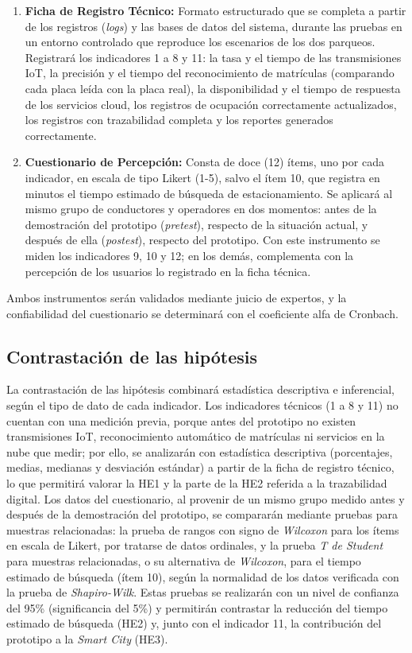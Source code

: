 \documentclass[12pt,a4paper]{article}
\begin{document}
\begin{enumerate}
	\item \textbf{Ficha de Registro Técnico:} Formato estructurado que se completa a partir de los registros (\textit{logs}) y las bases de datos del sistema, durante las pruebas en un entorno controlado que reproduce los escenarios de los dos parqueos. Registrará los indicadores 1 a 8 y 11: la tasa y el tiempo de las transmisiones IoT, la precisión y el tiempo del reconocimiento de matrículas (comparando cada placa leída con la placa real), la disponibilidad y el tiempo de respuesta de los servicios cloud, los registros de ocupación correctamente actualizados, los registros con trazabilidad completa y los reportes generados correctamente.
	\item \textbf{Cuestionario de Percepción:} Consta de doce (12) ítems, uno por cada indicador, en escala de tipo Likert (1-5), salvo el ítem 10, que registra en minutos el tiempo estimado de búsqueda de estacionamiento. Se aplicará al mismo grupo de conductores y operadores en dos momentos: antes de la demostración del prototipo (\textit{pretest}), respecto de la situación actual, y después de ella (\textit{postest}), respecto del prototipo. Con este instrumento se miden los indicadores 9, 10 y 12; en los demás, complementa con la percepción de los usuarios lo registrado en la ficha técnica.
\end{enumerate}

Ambos instrumentos serán validados mediante juicio de expertos, y la confiabilidad del cuestionario se determinará con el coeficiente alfa de Cronbach.

\subsection{Contrastación de las hipótesis}
La contrastación de las hipótesis combinará estadística descriptiva e inferencial, según el tipo de dato de cada indicador. Los indicadores técnicos (1 a 8 y 11) no cuentan con una medición previa, porque antes del prototipo no existen transmisiones IoT, reconocimiento automático de matrículas ni servicios en la nube que medir; por ello, se analizarán con estadística descriptiva (porcentajes, medias, medianas y desviación estándar) a partir de la ficha de registro técnico, lo que permitirá valorar la HE1 y la parte de la HE2 referida a la trazabilidad digital. Los datos del cuestionario, al provenir de un mismo grupo medido antes y después de la demostración del prototipo, se compararán mediante pruebas para muestras relacionadas: la prueba de rangos con signo de \textit{Wilcoxon} para los ítems en escala de Likert, por tratarse de datos ordinales, y la prueba \textit{T de Student} para muestras relacionadas, o su alternativa de \textit{Wilcoxon}, para el tiempo estimado de búsqueda (ítem 10), según la normalidad de los datos verificada con la prueba de \textit{Shapiro-Wilk}. Estas pruebas se realizarán con un nivel de confianza del 95\% (significancia del 5\%) y permitirán contrastar la reducción del tiempo estimado de búsqueda (HE2) y, junto con el indicador 11, la contribución del prototipo a la \textit{Smart City} (HE3).
\end{document}

